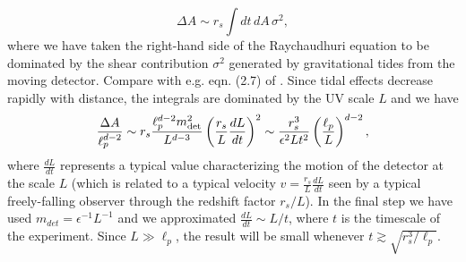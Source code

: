 \documentclass[12pt]{article}
\begin{document}
\begin{equation}
\Delta A \sim r_s   \int dt \,dA\, \sigma^2,
\end{equation}
where we have taken the right-hand side of the Raychaudhuri equation to be dominated by the shear contribution
$\sigma^2$  generated by gravitational tides from the moving detector.   Compare with e.g. eqn. (2.7) of \cite{Amsel:2007mh}.  Since tidal effects decrease rapidly with distance, the integrals are dominated by the UV scale $L$ and we have
\begin{equation}
\frac{\Delta A}{\ell_p^{d-2}} \sim r_s    \frac{\ell_p^{d-2}m_{\rm det}^2}{L^{d-3}}   \left(\frac{r_s}{L} \frac{dL}{dt}\right)^2 \sim \frac{r_s^3}{\epsilon^2 Lt^2}   \left( \frac{\ell_p}{L}\right)^{d-2}   ,
\end{equation}
where $\frac{dL}{dt}$ represents a  typical value characterizing the motion of the detector at the scale $L$ (which is related to a typical velocity $v = \frac{r_s}{L} \frac{dL}{dt}$ seen by a typical freely-falling observer through the redshift factor $r_s/L$).  In the final step we have used $m_{det} = \epsilon^{-1} L^{-1}$ and we approximated $\frac{dL}{dt} \sim L/t$, where $t$ is the timescale of the experiment.    Since $L \gg \ell_p$, the result will be small whenever $t \gtrsim \sqrt{r_s^3/ \ell_p}$.
\end{document}
